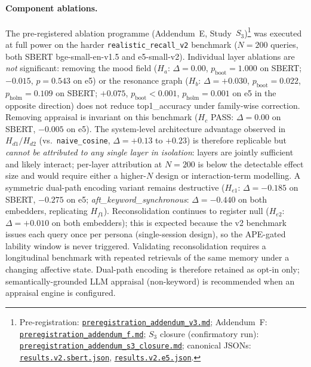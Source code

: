 \documentclass[11pt]{article}
\newcommand{\repourl}{https://github.com/gianlucamazza/emotional-memory}%
\begin{document}
\paragraph{Component ablations.}
The pre-registered ablation programme (Addendum~E, Study~$S_3$)\footnote{Pre-registration:
\href{\repourl/blob/main/benchmarks/preregistration\_addendum\_v3.md}{\texttt{preregistration\_addendum\_v3.md}};
Addendum~F:
\href{\repourl/blob/main/benchmarks/preregistration\_addendum\_f.md}{\texttt{preregistration\_addendum\_f.md}};
$S_3$ closure (confirmatory run):
\href{\repourl/blob/main/benchmarks/preregistration\_addendum\_s3\_closure.md}%
{\texttt{preregistration\_addendum\_s3\_closure.md}};
canonical JSONs:
\href{\repourl/blob/main/benchmarks/ablation/results.v2.sbert.json}%
{\texttt{results.v2.sbert.json}},
\href{\repourl/blob/main/benchmarks/ablation/results.v2.e5.json}%
{\texttt{results.v2.e5.json}}.}
was executed at full power on the harder \texttt{realistic\_recall\_v2}
benchmark ($N=200$ queries, both SBERT bge-small-en-v1.5 and e5-small-v2).
Individual layer ablations are \emph{not} significant: removing the mood
field ($H_a$: $\Delta=0.00$, $p_{\text{boot}}=1.000$ on SBERT; $-0.015$,
$p=0.543$ on e5) or the resonance graph ($H_b$: $\Delta=+0.030$,
$p_{\text{boot}}=0.022$, $p_{\text{holm}}=0.109$ on SBERT; $+0.075$,
$p_{\text{boot}}<0.001$, $p_{\text{holm}}=0.001$ on e5 in the opposite
direction) does not reduce top1\_accuracy under family-wise correction.
Removing appraisal is invariant on this benchmark
($H_c$ PASS: $\Delta=0.00$ on SBERT, $-0.005$ on e5). The system-level
architecture advantage observed in $H_{d1}/H_{d2}$ (vs.\ \texttt{naive\_cosine},
$\Delta=+0.13$ to $+0.23$) is therefore replicable but \emph{cannot be
attributed to any single layer in isolation}: layers are jointly sufficient
and likely interact; per-layer attribution at $N=200$ is below the
detectable effect size and would require either a higher-$N$ design or
interaction-term modelling.
A symmetric dual-path encoding variant remains destructive
($H_{e1}$: $\Delta=-0.185$ on SBERT, $-0.275$ on e5;
\textit{aft\_keyword\_synchronous}: $\Delta=-0.440$ on both embedders,
replicating $H_{f1}$). Reconsolidation continues to register null
($H_{e2}$: $\Delta=+0.010$ on both embedders); this is expected because
the v2 benchmark issues each query once per persona (single-session
design), so the APE-gated lability window is never triggered.
Validating reconsolidation requires a longitudinal benchmark with
repeated retrievals of the same memory under a changing affective state.
Dual-path encoding is therefore retained as opt-in only; semantically-grounded
LLM appraisal (non-keyword) is recommended when an appraisal engine is configured.
\end{document}
